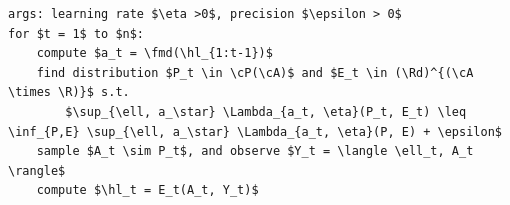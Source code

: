\documentclass{article}
\theoremstyle{plain}
\theoremstyle{definition}
\renewcommand{\epsilon}{\varepsilon}
\newcommand{\R}{\mathbb R}
\newcommand{\Rd}{\mathbb{R}^d}
\newcommand{\cA}{\mathcal A}
\newcommand{\cP}{\mathcal P}
\newcommand{\fmd}{\texttt{MD}}
\newcommand{\expbyopt}{\textsf{ExpByOpt}\xspace}
\newcommand{\hl}{\hat{\ell}\xspace}
\begin{document}
\begin{algorithm}[h!]
    \begin{minipage}{12cm}
        \begin{mdframed}
            \begin{lstlisting}
args: learning rate $\eta >0$, precision $\epsilon > 0$
for $t = 1$ to $n$:
    compute $a_t = \fmd(\hl_{1:t-1})$
    find distribution $P_t \in \cP(\cA)$ and $E_t \in (\Rd)^{(\cA \times \R)}$ s.t.
        $\sup_{\ell, a_\star} \Lambda_{a_t, \eta}(P_t, E_t) \leq \inf_{P,E} \sup_{\ell, a_\star} \Lambda_{a_t, \eta}(P, E) + \epsilon$
    sample $A_t \sim P_t$, and observe $Y_t = \langle \ell_t, A_t \rangle$
    compute $\hl_t = E_t(A_t, Y_t)$
\end{lstlisting}
            \caption{\expbyopt}\label{alg:exp-by-opt}
        \end{mdframed}
    \end{minipage}
\end{algorithm}
\end{document}
